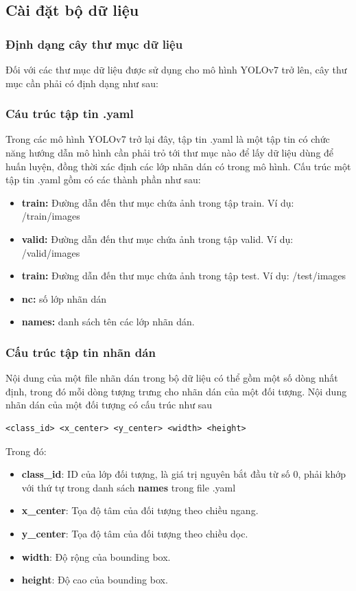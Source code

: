 \subsection{Cài đặt bộ dữ liệu}
\subsubsection{Định dạng cây thư mục dữ liệu}
Đối với các thư mục dữ liệu được sử dụng cho mô hình YOLOv7 trở lên, cây thư mục cần phải có định dạng như sau:

\subsubsection{Cáu trúc tập tin .yaml}
Trong các mô hình YOLOv7 trở lại đây, tập tin .yaml là một tập tin có chức năng hướng dẫn mô hình cần phải trỏ tới thư mục nào để lấy dữ liệu dùng để huấn luyện, đồng thời xác định các lớp nhãn dán có trong mô hình. Cấu trúc một tập tin .yaml gồm có các thành phần như sau:
\begin{itemize}
    \item \textbf{train:} Đường dẫn đến thư mục chứa ảnh trong tập train. Ví dụ: /train/images
    \item \textbf{valid:} Đường dẫn đến thư mục chứa ảnh trong tập valid. Ví dụ: /valid/images
    \item \textbf{train:} Đường dẫn đến thư mục chứa ảnh trong tập test. Ví dụ: /test/images
    \item \textbf{nc:} số lớp nhãn dán
    \item \textbf{names:} danh sách tên các lớp nhãn dán.
\end{itemize}
\subsubsection{Cấu trúc tập tin nhãn dán}
Nội dung của một file nhãn dán trong bộ dữ liệu có thể gồm một số dòng nhất định, trong đó mỗi dòng tượng trưng cho nhãn dán của một đối tượng. Nội dung nhãn dán của một đối tượng có cấu trúc như sau
\begin{lstlisting}[language=tex]
<class_id> <x_center> <y_center> <width> <height>
\end{lstlisting}
Trong đó:
\begin{itemize}
    \item \textbf{class\_id}: ID của lớp đối tượng, là giá trị nguyên bắt đầu từ số 0, phải khớp với thứ tự trong danh sách \textbf{names} trong file .yaml
    \item \textbf{x\_center}: Tọa độ tâm của đối tượng theo chiều ngang.
    \item \textbf{y\_center}: Tọa độ tâm của đối tượng theo chiều dọc.
    \item \textbf{width}: Độ rộng của bounding box.
    \item \textbf{height}: Độ cao của bounding box.
\end{itemize}

